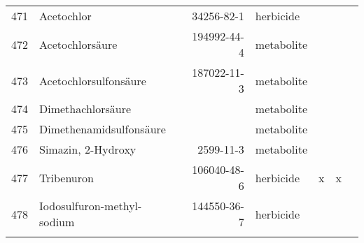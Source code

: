 \begin{longtable}{lp{3cm}rlp{0.5cm}p{0.5cm}p{1cm}}
  471 & Acetochlor & 34256-82-1 & herbicide &  &  &  \\ 
  472 & Acetochlorsäure & 194992-44-4 & metabolite &  &  &  \\ 
  473 & Acetochlorsulfonsäure & 187022-11-3 & metabolite &  &  &  \\ 
  474 & Dimethachlorsäure &  & metabolite &  &  &  \\ 
  475 & Dimethenamidsulfonsäure &  & metabolite &  &  &  \\ 
  476 & Simazin, 2-Hydroxy & 2599-11-3 & metabolite &  &  &  \\ 
  477 & Tribenuron & 106040-48-6 & herbicide & x & x &  \\ 
  478 & Iodosulfuron-methyl-sodium & 144550-36-7 & herbicide &  &  &  \\ 
  \label{tab:phch_var}
\end{longtable}
\endgroup
